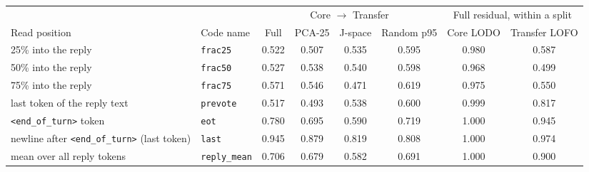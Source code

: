 \begin{tabular}{@{}llcccccc@{}}\toprule
 & & \multicolumn{4}{c}{Core $\to$ Transfer} & \multicolumn{2}{c}{Full residual, within a split}\\
\cmidrule(lr){3-6}\cmidrule(l){7-8}
Read position & Code name & Full & PCA-25 & J-space & Random p95 & Core LODO & Transfer LOFO\\\midrule
25\% into the reply & \texttt{frac25} & 0.522 & 0.507 & 0.535 & 0.595 & 0.980 & 0.587\\
50\% into the reply & \texttt{frac50} & 0.527 & 0.538 & 0.540 & 0.598 & 0.968 & 0.499\\
75\% into the reply & \texttt{frac75} & 0.571 & 0.546 & 0.471 & 0.619 & 0.975 & 0.550\\
last token of the reply text & \texttt{prevote} & 0.517 & 0.493 & 0.538 & 0.600 & 0.999 & 0.817\\
\texttt{<end\_of\_turn>} token & \texttt{eot} & 0.780 & 0.695 & 0.590 & 0.719 & 1.000 & 0.945\\
newline after \texttt{<end\_of\_turn>} (last token) & \texttt{last} & 0.945 & 0.879 & 0.819 & 0.808 & 1.000 & 0.974\\
mean over all reply tokens & \texttt{reply\_mean} & 0.706 & 0.679 & 0.582 & 0.691 & 1.000 & 0.900\\
\bottomrule\end{tabular}
